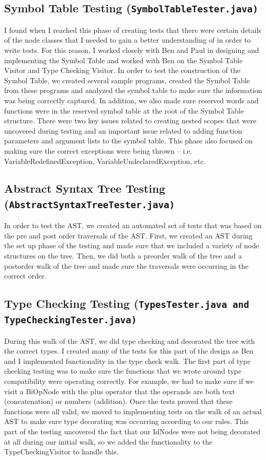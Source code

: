 \documentclass{report}
\begin{document}
\subsection*{Symbol Table Testing (\tt SymbolTableTester.java\rm)}
I found when I reached this phase of creating tests that there were certain details of the node classes that I needed to gain a better understanding of in order to write tests. For this reason, I worked closely with Ben and Paul in designing and implementing the Symbol Table and worked with Ben on the Symbol Table Visitor and Type Checking Visitor. In order to test the construction of the Symbol Table, we created several sample programs, created the Symbol Table from these programs and analyzed the symbol table to make sure the information was being correctly captured. In addition, we also made sure reserved words and functions were in the reserved symbol table at the root of the Symbol Table structure. There were two key issues related to creating nested scopes that were uncovered during testing and an important issue related to adding function parameters and argument lists to the symbol table. This phase also focused on making sure the correct exceptions were being thrown – i.e. VariableRedefinedException, VariableUndeclaredException, etc.

\subsection*{Abstract Syntax Tree Testing (\tt AbstractSyntaxTreeTester.java\rm)}

In order to test the AST, we created an automated set of tests that was based on the pre and post order traversals of the AST. First, we created an AST during the set up phase of the testing and made sure that we included a variety of node structures on the tree. Then, we did both a preorder walk of the tree and a postorder walk of the tree and made sure the traversals were occurring in the correct order.  

\subsection*{Type Checking Testing (\tt TypesTester.java\rm \,and \tt  TypeCheckingTester.java\rm)}

During this walk of the AST, we did type checking and decorated the tree with the correct types. I created many of the tests for this part of the design as Ben and I implemented functionality in the type check walk. The first part of type checking testing was to make sure the functions that we wrote around type compatibility were operating correctly. For example, we had to make sure if we visit a BiOpNode with the plus operator that the operands are both text (concatenation) or numbers (addition). Once the tests proved that these functions were all valid, we moved to implementing tests on the walk of an actual AST to make sure type decorating was occurring according to our rules. This part of the testing uncovered the fact that our IdNodes were not being decorated at all during our initial walk, so we added the functionality to the TypeCheckingVisitor to handle this.  
\end{document}
